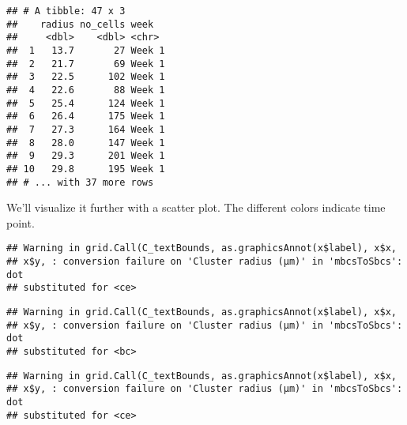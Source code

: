 \documentclass[]{article}
\newenvironment{Shaded}{\begin{snugshade}}{\end{snugshade}}
\newcommand{\KeywordTok}[1]{\textcolor[rgb]{0.13,0.29,0.53}{\textbf{#1}}}
\newcommand{\DataTypeTok}[1]{\textcolor[rgb]{0.13,0.29,0.53}{#1}}
\newcommand{\StringTok}[1]{\textcolor[rgb]{0.31,0.60,0.02}{#1}}
\newcommand{\OperatorTok}[1]{\textcolor[rgb]{0.81,0.36,0.00}{\textbf{#1}}}
\newcommand{\NormalTok}[1]{#1}
\begin{document}
\begin{verbatim}
## # A tibble: 47 x 3
##    radius no_cells week  
##     <dbl>    <dbl> <chr> 
##  1   13.7       27 Week 1
##  2   21.7       69 Week 1
##  3   22.5      102 Week 1
##  4   22.6       88 Week 1
##  5   25.4      124 Week 1
##  6   26.4      175 Week 1
##  7   27.3      164 Week 1
##  8   28.0      147 Week 1
##  9   29.3      201 Week 1
## 10   29.8      195 Week 1
## # ... with 37 more rows
\end{verbatim}

We'll visualize it further with a scatter plot. The different colors
indicate time point.

\begin{Shaded}
\end{Shaded}

\begin{verbatim}
## Warning in grid.Call(C_textBounds, as.graphicsAnnot(x$label), x$x,
## x$y, : conversion failure on 'Cluster radius (μm)' in 'mbcsToSbcs': dot
## substituted for <ce>
\end{verbatim}

\begin{verbatim}
## Warning in grid.Call(C_textBounds, as.graphicsAnnot(x$label), x$x,
## x$y, : conversion failure on 'Cluster radius (μm)' in 'mbcsToSbcs': dot
## substituted for <bc>
\end{verbatim}

\begin{verbatim}
## Warning in grid.Call(C_textBounds, as.graphicsAnnot(x$label), x$x,
## x$y, : conversion failure on 'Cluster radius (μm)' in 'mbcsToSbcs': dot
## substituted for <ce>
\end{verbatim}
\end{document}

